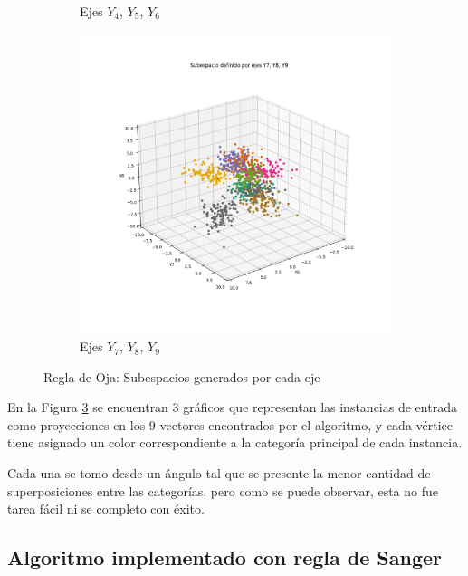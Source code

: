 \documentclass[a4paper,10pt]{article}
\begin{document}
\begin{figure}[H]
\begin{subfigure}{.5\textwidth}
		\caption{Ejes $Y_4$, $Y_5$, $Y_6$}
		\label{fig:oja-2er_subesp}
	\end{subfigure}
	\begin{center}
		\begin{subfigure}{.5\textwidth}
			\centering
			\includegraphics[width=\textwidth]{imgs/oja-subespacio-y7_y8_y9.png}
			\caption{Ejes $Y_7$, $Y_8$, $Y_9$}
			\label{fig:oja-3er_subesp}
		\end{subfigure}
	\end{center}

	\caption{Regla de Oja: Subespacios generados por cada eje}
	\label{fig:oja-subespacios}
\end{figure}

En la Figura \ref{fig:oja-subespacios} se encuentran 3 gráficos que
representan las instancias de entrada como proyecciones en los 9 vectores
encontrados por el algoritmo, y cada vértice tiene asignado un color
correspondiente a la categoría principal de cada instancia.

Cada una se tomo desde un ángulo tal que se presente la menor cantidad de
superposiciones entre las categorías, pero como se puede observar, esta no fue
tarea fácil ni se completo con éxito.

\subsection{Algoritmo implementado con regla de Sanger}
\end{document}
